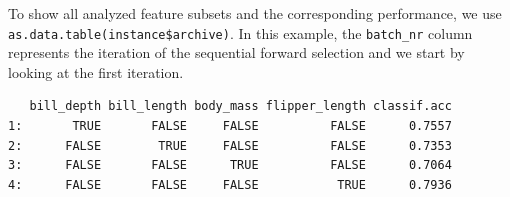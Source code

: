 \begin{Shaded}
\begin{Highlighting}[]

\OtherTok{=} \NormalTok{(}\NormalTok{)}
\SpecialCharTok{$}\NormalTok{(}\NormalTok{(}\NormalTok{, }\NormalTok{, }\NormalTok{,}
  \NormalTok{))}

\OtherTok{=} \NormalTok{(}
   \NormalTok{(}\NormalTok{),}
   \NormalTok{(}\NormalTok{, } \NormalTok{),}
   \NormalTok{(}\NormalTok{)}
\NormalTok{)}
\end{Highlighting}
\end{Shaded}

To show all analyzed feature subsets and the corresponding performance,
we use \texttt{as.data.table(instance\$archive)}. In this example, the
\texttt{batch\_nr} column represents the iteration of the sequential
forward selection and we start by
looking at the first iteration.

\begin{Shaded}
\begin{Highlighting}[]
\OtherTok{=} \SpecialCharTok{$}
\NormalTok{dt[batch\_nr }\SpecialCharTok{==} \NormalTok{, }\SpecialCharTok{:}\NormalTok{]}
\end{Highlighting}
\end{Shaded}

\begin{verbatim}
   bill_depth bill_length body_mass flipper_length classif.acc
1:       TRUE       FALSE     FALSE          FALSE      0.7557
2:      FALSE        TRUE     FALSE          FALSE      0.7353
3:      FALSE       FALSE      TRUE          FALSE      0.7064
4:      FALSE       FALSE     FALSE           TRUE      0.7936
\end{verbatim}

